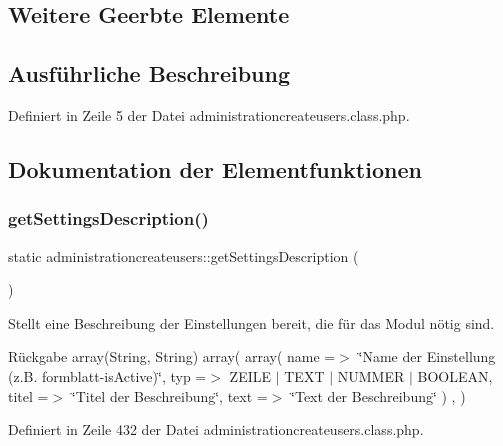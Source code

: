 \subsection*{Weitere Geerbte Elemente}


\subsection{Ausführliche Beschreibung}


Definiert in Zeile 5 der Datei administrationcreateusers.\+class.\+php.



\subsection{Dokumentation der Elementfunktionen}
\mbox{\label{classadministrationcreateusers_a15fb29227d0451164940e8b1cb082d8c}} 
\subsubsection{\texorpdfstring{get\+Settings\+Description()}{getSettingsDescription()}}
{\footnotesize\ttfamily static administrationcreateusers\+::get\+Settings\+Description (\begin{DoxyParamCaption}{ }\end{DoxyParamCaption})\hspace{0.3cm}{\ttfamily [static]}}

Stellt eine Beschreibung der Einstellungen bereit, die für das Modul nötig sind. \begin{DoxyReturn}{Rückgabe}
array(\+String, String) array( array( \textquotesingle{}name\textquotesingle{} =$>$ \char`\"{}\+Name der Einstellung (z.\+B. formblatt-\/is\+Active)\char`\"{}, \textquotesingle{}typ\textquotesingle{} =$>$ Z\+E\+I\+LE $\vert$ T\+E\+XT $\vert$ N\+U\+M\+M\+ER $\vert$ B\+O\+O\+L\+E\+AN, \textquotesingle{}titel\textquotesingle{} =$>$ \char`\"{}\+Titel der Beschreibung\char`\"{}, \textquotesingle{}text\textquotesingle{} =$>$ \char`\"{}\+Text der Beschreibung\char`\"{} ) , ) 
\end{DoxyReturn}


Definiert in Zeile 432 der Datei administrationcreateusers.\+class.\+php.

